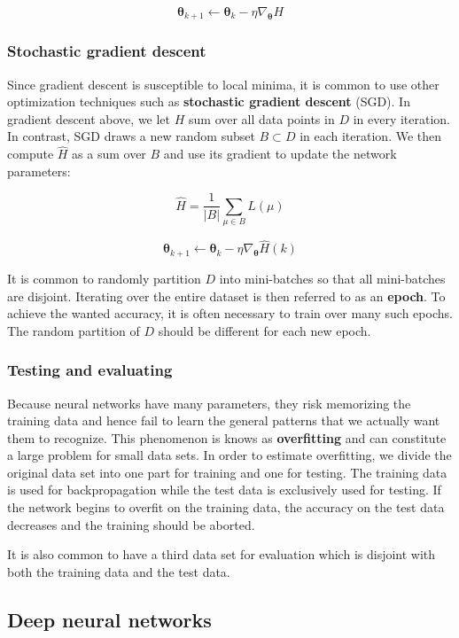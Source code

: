 \[
\mathbf{\theta}_{k+1} \leftarrow
\mathbf{\theta}_k - \eta \nabla_{\mathbf{\theta}} H
\]

\subsubsection{Stochastic gradient descent}

Since gradient descent is susceptible to local minima, it is common to use other optimization techniques such as \textbf{stochastic gradient descent} (SGD).
In gradient descent above, we let $H$ sum over all data points in $D$ in every iteration. In contrast, SGD draws a new random subset $B \subset D$ in each iteration. We then compute $\hat{H}$ as a sum over $B$ and use its gradient to update the network parameters:

\[
\hat{H} = \frac{1}{\vert B \vert} \sum_{\mu \in B} L(\mu)
\]

\[
\mathbf{\theta}_{k+1} \leftarrow
\mathbf{\theta}_k - \eta \nabla_{\mathbf{\theta}} \hat{H}(k)
\]

It is common to randomly partition $D$ into mini-batches so that all mini-batches are disjoint. Iterating over the entire dataset is then referred to as an \textbf{epoch}.
To achieve the wanted accuracy, it is often necessary to train over many such epochs.
The random partition of $D$ should be different for each new epoch.


\subsubsection{Testing and evaluating}

Because neural networks have many parameters, they risk memorizing the training data and hence fail to learn the general patterns that we actually want them to recognize.
This phenomenon is knows as \textbf{overfitting} and can constitute a large problem for small data sets. In order to estimate overfitting, we divide the original data set into one part for training and one for testing. The training data is used for backpropagation while the test data is exclusively used for testing. If the network begins to overfit on the training data, the accuracy on the test data decreases and the training should be aborted.

It is also common to have a third data set for evaluation which is disjoint with both the training data and the test data.


\subsection{Deep neural networks}


